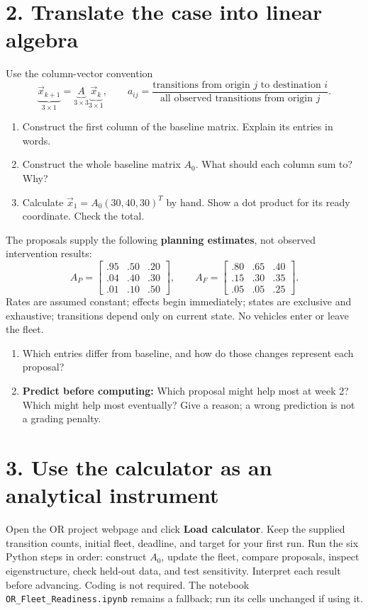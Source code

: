 \documentclass[10pt,letterpaper]{article}
\newcommand{\spacefor}[1]{\vspace{#1}}
\begin{document}
\section*{2. Translate the case into linear algebra}
Use the column-vector convention
\[
\underbrace{\vec{x}_{k+1}}_{3\times1}
=\underbrace{A}_{3\times3}\underbrace{\vec{x}_k}_{3\times1},
\qquad
a_{ij}=\frac{\text{transitions from origin }j\text{ to destination }i}
{\text{all observed transitions from origin }j}.
\]
\begin{enumerate}[label=(\alph*),nosep]
\item Construct the first column of the baseline matrix. Explain its entries in words.
\spacefor{0.45in}
\item Construct the whole baseline matrix $A_0$. What should each column sum to? Why?
\spacefor{0.65in}
\item Calculate $\vec{x}_1=A_0(30,40,30)^T$ by hand. Show a dot product for its ready coordinate. Check the total.
\spacefor{0.75in}
\end{enumerate}
The proposals supply the following \textbf{planning estimates}, not observed intervention results:
\[
A_P=\begin{bmatrix}.95&.50&.20\\.04&.40&.30\\.01&.10&.50\end{bmatrix},
\qquad
A_F=\begin{bmatrix}.80&.65&.40\\.15&.30&.35\\.05&.05&.25\end{bmatrix}.
\]
Rates are assumed constant; effects begin immediately; states are exclusive and exhaustive; transitions depend only on current state. No vehicles enter or leave the fleet.
\begin{enumerate}[label=(\alph*),resume,nosep]
\item Which entries differ from baseline, and how do those changes represent each proposal?
\spacefor{0.45in}
\item \textbf{Predict before computing:} Which proposal might help most at week 2? Which might help most eventually? Give a reason; a wrong prediction is not a grading penalty.
\spacefor{0.5in}
\end{enumerate}

\newpage
\section*{3. Use the calculator as an analytical instrument}
Open the OR project webpage and click \textbf{Load calculator}. Keep the supplied transition counts, initial fleet, deadline, and target for your first run. Run the six Python steps in order: construct $A_0$, update the fleet, compare proposals, inspect eigenstructure, check held-out data, and test sensitivity. Interpret each result before advancing. Coding is not required. The notebook \texttt{OR\_Fleet\_Readiness.ipynb} remains a fallback; run its cells unchanged if using it.
\end{document}
